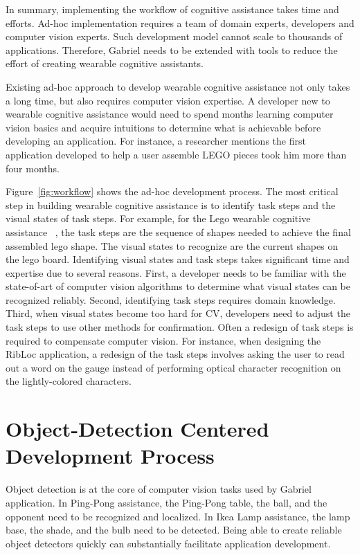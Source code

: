 In summary, implementing the workflow of cognitive assistance takes time and
efforts. Ad-hoc implementation requires a team of domain experts, developers and
computer vision experts. Such development model cannot scale to thousands of
applications. Therefore, Gabriel needs to be extended with tools to reduce the
effort of creating wearable cognitive assistants.

Existing ad-hoc approach to develop wearable cognitive assistance not only takes
a long time, but also requires computer vision expertise. A developer new to
wearable cognitive assistance would need to spend months learning computer
vision basics and acquire intuitions to determine what is achievable before
developing an application. For instance, a researcher mentions the first
application developed to help a user assemble LEGO pieces took him more than
four months.

Figure~\ref{fig:workflow} shows the ad-hoc development process. The most
critical step in building wearable cognitive assistance is to identify task
steps and the visual states of task steps. For example, for the Lego wearable
cognitive assistance ~\cite{chen2017empirical}, the task steps are the sequence
of shapes needed to achieve the final assembled lego shape. The visual states to
recognize are the current shapes on the lego board. Identifying visual states
and task steps takes significant time and expertise due to several reasons.
First, a developer needs to be familiar with the state-of-art of computer vision
algorithms to determine what visual states can be recognized reliably. Second,
identifying task steps requires domain knowledge. Third, when visual states
become too hard for CV, developers need to adjust the task steps to use other
methods for confirmation. Often a redesign of task steps is required to
compensate computer vision. For instance, when designing the RibLoc application,
a redesign of the task steps involves asking the user to read out a word on the
gauge instead of performing optical character recognition on the lightly-colored
characters.

\section{Object-Detection Centered Development Process}

Object detection is at the core of computer vision tasks used by Gabriel
application. In Ping-Pong assistance, the Ping-Pong table, the ball, and the
opponent need to be recognized and localized. In Ikea Lamp assistance, the lamp
base, the shade, and the bulb need to be detected. Being able to create reliable
object detectors quickly can substantially facilitate application development.

